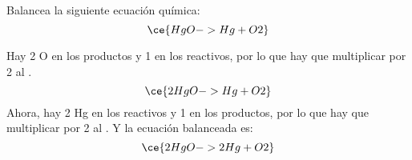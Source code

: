 Balancea la siguiente ecuación química:
\[\ce{HgO -> Hg + O2}\]
\begin{solutionbox}{4cm}
    Hay 2 O en los productos y 1 en los reactivos, por lo que hay que multiplicar por 2 al .
    \[ \ce{2HgO -> Hg + O2}\]
    Ahora, hay 2 Hg en los reactivos y 1 en los productos, por lo que hay que multiplicar por 2 al . Y la ecuación balanceada es:
    \[ \ce{2HgO -> 2Hg + O2}\]
\end{solutionbox}
